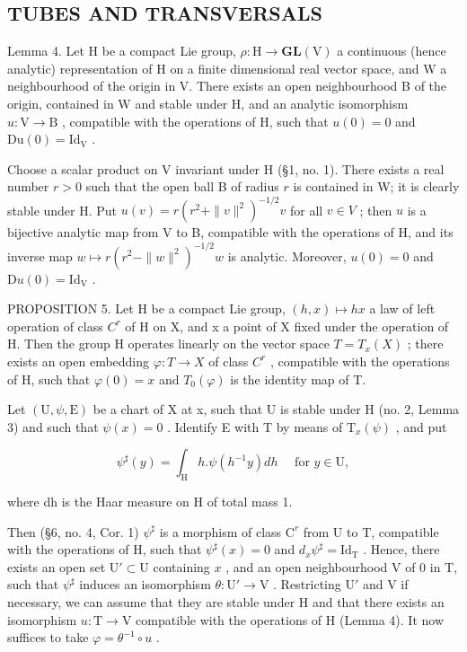 \subsection{TUBES AND TRANSVERSALS}

Lemma 4. Let H be a compact Lie group, \(\rho : \mathrm{H} \to \mathbf{GL}(\mathrm{V})\) a continuous (hence analytic) representation of H on a finite dimensional real vector space, and W a neighbourhood of the origin in V. There exists an open neighbourhood B of the origin, contained in W and stable under H, and an analytic isomorphism \(u: \mathrm{V} \to \mathrm{B}\) , compatible with the operations of H, such that \(u(0) = 0\) and \(\mathrm{Du}(0) = \mathrm{Id}_{\mathrm{V}}\) .

Choose a scalar product on V invariant under H (§1, no. 1). There exists a real number \(r > 0\) such that the open ball B of radius \(r\) is contained in W; it is clearly stable under H. Put \(u(v) = r(r^2 + \|v\|^2)^{-1/2} v\) for all \(v \in V\) ; then \(u\) is a bijective analytic map from V to B, compatible with the operations of H, and its inverse map \(w \mapsto r(r^2 - \|w\|^2)^{-1/2} w\) is analytic. Moreover, \(u(0) = 0\) and \(\mathrm{D}u(0) = \mathrm{Id}_{\mathrm{V}}\) .

PROPOSITION 5. Let H be a compact Lie group, \((h,x)\mapsto hx\) a law of left operation of class \(C^{r}\) of H on X, and x a point of X fixed under the operation of H. Then the group H operates linearly on the vector space \(T=T_{x}(X)\) ; there exists an open embedding \(\varphi:T\to X\) of class \(C^{r}\) , compatible with the operations of H, such that \(\varphi(0)=x\) and \(T_{0}(\varphi)\) is the identity map of T.

Let \((\mathrm{U},\psi,\mathrm{E})\) be a chart of X at x, such that U is stable under H (no. 2, Lemma 3) and such that \(\psi(x)=0\) . Identify E with T by means of \(\mathrm{T}_{x}(\psi)\) , and put

\[
\psi^ {\sharp} (y) = \int_ {\mathrm{H}} h. \psi (h ^ {- 1} y) d h \quad \text { for } y \in \mathrm{U},
\]

where dh is the Haar measure on H of total mass 1.

Then (§6, no. 4, Cor. 1) \(\psi^{\sharp}\) is a morphism of class \(\mathrm{C}^r\) from U to T, compatible with the operations of H, such that \(\psi^{\sharp}(x) = 0\) and \(d_x\psi^\sharp = \mathrm{Id}_\mathrm{T}\) . Hence, there exists an open set \(\mathrm{U}' \subset \mathrm{U}\) containing \(x\) , and an open neighbourhood V of 0 in T, such that \(\psi^{\sharp}\) induces an isomorphism \(\theta: \mathrm{U}' \to \mathrm{V}\) . Restricting \(\mathrm{U}'\) and V if necessary, we can assume that they are stable under H and that there exists an isomorphism \(u: \mathrm{T} \to \mathrm{V}\) compatible with the operations of H (Lemma 4). It now suffices to take \(\varphi = \theta^{-1} \circ u\) .

